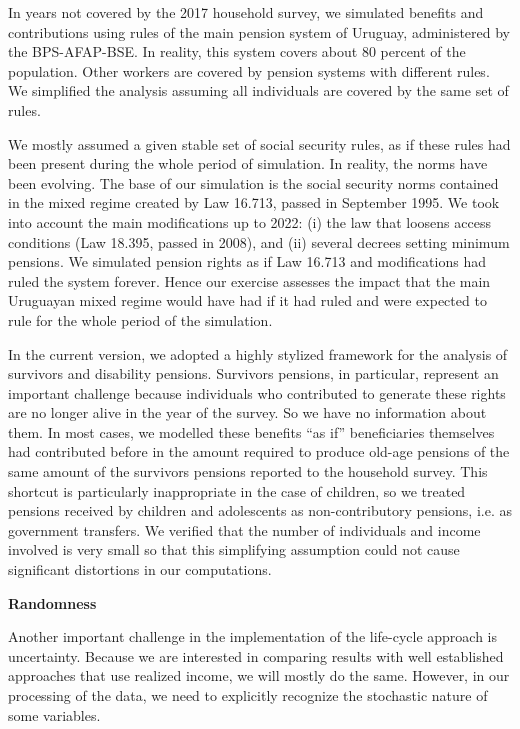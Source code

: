 \documentclass{article}
\begin{document}
In years not covered by the 2017 household survey, we simulated benefits and contributions using rules of the main pension system of Uruguay, administered by the BPS-AFAP-BSE. In reality, this system covers about 80 percent of the population. Other workers are covered by pension systems with different rules. We simplified the analysis assuming all individuals are covered by the same set of rules.

We mostly assumed a given stable set of social security rules, as if these rules had been present during the whole period of simulation. In reality, the norms have been evolving. The base of our simulation is the social security norms contained in the mixed regime created by Law 16.713, passed in September 1995. We took into account the main modifications up to 2022: (i) the law that loosens access conditions (Law 18.395, passed in 2008),  and (ii) several decrees setting minimum pensions. We simulated pension rights as if Law 16.713 and modifications had ruled the system forever. Hence our exercise assesses the impact that the main Uruguayan mixed regime  would have had if it had ruled and were expected to rule for the whole period of the simulation. 



    In the current version, we adopted a highly stylized framework for the analysis of survivors and disability pensions. Survivors pensions, in particular, represent an important challenge because individuals who contributed to generate these rights are no longer alive in the year of the survey. So we have no information about them. In most cases, we modelled these benefits ``as if'' beneficiaries themselves had contributed before in the amount required to produce old-age pensions of the same amount of the survivors pensions reported to the household survey. This shortcut is particularly inappropriate in the case of children, so we treated pensions received by children and adolescents as non-contributory pensions, i.e. as government transfers. We verified that the number of individuals and income involved is very small so that this simplifying assumption could not cause significant distortions in our computations. 

  \textbf{Randomness}  

Another important challenge in the implementation of the life-cycle approach is uncertainty. Because we are interested in comparing results with well established approaches that use realized income, we will mostly do the same. However, in our processing of the data, we need to explicitly recognize the stochastic nature of some variables. 
\end{document}
